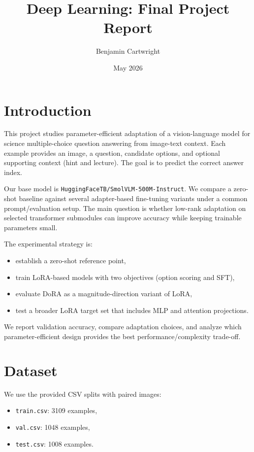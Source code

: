 \documentclass{article}
\title{Deep Learning: Final Project Report}
\author{Benjamin Cartwright }
\date{May 2026}
\begin{document}
\maketitle

\section{Introduction}

This project studies parameter-efficient adaptation of a vision-language model for science multiple-choice question answering from image-text context. Each example provides an image, a question, candidate options, and optional supporting context (hint and lecture). The goal is to predict the correct answer index.

Our base model is \texttt{HuggingFaceTB/SmolVLM-500M-Instruct}. We compare a zero-shot baseline against several adapter-based fine-tuning variants under a common prompt/evaluation setup. The main question is whether low-rank adaptation on selected transformer submodules can improve accuracy while keeping trainable parameters small.

The experimental strategy is:
\begin{itemize}
    \item establish a zero-shot reference point,
    \item train LoRA-based models with two objectives (option scoring and SFT),
    \item evaluate DoRA as a magnitude-direction variant of LoRA,
    \item test a broader LoRA target set that includes MLP and attention projections.
\end{itemize}

We report validation accuracy, compare adaptation choices, and analyze which parameter-efficient design provides the best performance/complexity trade-off.

\section{Dataset}

We use the provided CSV splits with paired images:
\begin{itemize}
    \item \texttt{train.csv}: 3109 examples,
    \item \texttt{val.csv}: 1048 examples,
    \item \texttt{test.csv}: 1008 examples.
\end{itemize}
\end{document}
